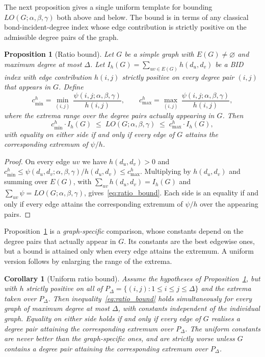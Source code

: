 \documentclass[a5paper, 10pt]{article}
\theoremstyle{plain}
\newtheorem{proposition}[theorem]{Proposition}
\newtheorem*{corollary}{Corollary}
\theoremstyle{remark}
\theoremstyle{definition}
\newcommand{\Wuzi}{LO(G;\alpha,\beta,\gamma)}
\begin{document}
  The next proposition gives a single uniform template for bounding
  $\Wuzi$ both above and below. The bound is in terms of any classical
  bond-incident-degree index whose edge contribution is strictly
  positive on the admissible degree pairs of the graph.

  \begin{proposition}[Ratio bound]\label{thm:ratio_bound}
  Let $G$ be a simple graph with $E(G) \ne \varnothing$ and maximum degree at most $\Delta$. Let
  $I_h(G) = \sum_{uv \in E(G)} h(d_u, d_v)$ be a BID index with
  edge contribution $h(i, j)$ strictly positive on every degree pair
  $(i, j)$ that appears in $G$. Define
  \[
  c_{\min}^{h} = \min_{(i, j)}\,\frac{\psi(i, j; \alpha, \beta,
  \gamma)}{h(i, j)},
  \qquad
  c_{\max}^{h} = \max_{(i, j)}\,\frac{\psi(i, j; \alpha, \beta,
  \gamma)}{h(i, j)},
  \]
  where the extrema range over the degree pairs actually appearing in
  $G$.
  Then
  \begin{equation}\label{eq:ratio_bound}
  c_{\min}^{h} \cdot I_h(G)
  \;\le\; \Wuzi
  \;\le\; c_{\max}^{h} \cdot I_h(G),
  \end{equation}
  with equality on either side if and only if every edge of $G$
  attains the corresponding extremum of $\psi/h$.
  \end{proposition}

  \begin{proof}
  On every edge $uv$ we have $h(d_u, d_v) > 0$ and $c_{\min}^{h} \le \psi(d_u, d_v; \alpha,
  \beta, \gamma)/h(d_u, d_v) \le c_{\max}^{h}$. Multiplying by $h(d_u, d_v)$
  and summing over $E(G)$, with
  $\sum_{uv} h(d_u, d_v) = I_h(G)$ and $\sum_{uv} \psi = \Wuzi$,
  gives~\eqref{eq:ratio_bound}. Each side is an equality if and only if
  every edge attains the corresponding extremum of $\psi/h$ over the
  appearing pairs.
  \end{proof}

  Proposition~\ref{thm:ratio_bound} is a \emph{graph-specific}
  comparison, whose constants depend on the degree pairs that actually
  appear in $G$. Its constants are the best edgewise ones, but a bound
  is attained only when every edge attains the extremum. A uniform
  version follows by enlarging the range of the extrema.

  \begin{corollary}[Uniform ratio bound]\label{cor:ratio_uniform}
  Assume the hypotheses of Proposition~\ref{thm:ratio_bound}, but with $h$
  strictly positive on all of
  $P_{\Delta} = \{(i,j) : 1 \le i \le j \le \Delta\}$ and the extrema
  taken over $P_{\Delta}$. Then
  inequality~\eqref{eq:ratio_bound} holds simultaneously for every
  graph of maximum degree at most $\Delta$, with constants independent
  of the individual graph. Equality on either side holds if and only
  if every edge of $G$ realises a degree pair attaining the
  corresponding extremum over $P_{\Delta}$. The uniform constants are
  never better than the graph-specific ones, and are strictly worse
  unless $G$ contains a degree pair attaining the corresponding
  extremum over $P_{\Delta}$.
  \end{corollary}
\end{document}
